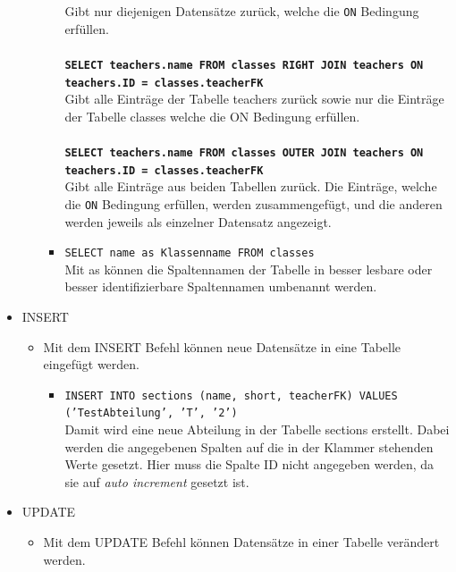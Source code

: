 \begin{itemize}
\begin{itemize}
\begin{itemize}
		    			Gibt nur diejenigen Datensätze zurück, welche die \texttt{ON} Bedingung erfüllen.\\\\
		    		\textbf{\texttt{SELECT teachers.name FROM classes RIGHT JOIN teachers ON \\teachers.ID = classes.teacherFK}}\\
		    			Gibt alle Einträge der Tabelle teachers zurück sowie nur die Einträge der Tabelle classes welche die ON Bedingung erfüllen.\\\\
		    		\textbf{\texttt{SELECT teachers.name FROM classes OUTER JOIN teachers ON \\teachers.ID = classes.teacherFK}}\\
		    			Gibt alle Einträge aus beiden Tabellen zurück. Die Einträge, welche die \texttt{ON} Bedingung erfüllen, werden zusammengefügt, und die anderen werden jeweils als einzelner Datensatz angezeigt.\\
		    	\item \texttt{SELECT name as Klassenname FROM classes}\\
		    		Mit as können die Spaltennamen der Tabelle in besser lesbare oder besser identifizierbare Spaltennamen umbenannt werden.
	    	\end{itemize}
    	\end{itemize}
    \item INSERT
	    \begin{itemize}
		   	\item Mit dem INSERT Befehl können neue Datensätze in eine Tabelle eingefügt werden.
		   	\begin{itemize}
			   	\item \texttt{INSERT INTO sections (name, short, teacherFK) VALUES \\('TestAbteilung', 'T', '2')}\\
			   		Damit wird eine neue Abteilung in der Tabelle sections erstellt. Dabei werden die angegebenen Spalten auf die in der Klammer stehenden Werte gesetzt. Hier muss die Spalte ID nicht angegeben werden, da sie auf \textit{auto increment} gesetzt ist.
		   	\end{itemize}
	    \end{itemize}
	\item UPDATE
		\begin{itemize}
			\item Mit dem UPDATE Befehl können Datensätze in einer Tabelle verändert werden.
			\begin{itemize}

\end{itemize}
\end{itemize}
\end{itemize}
